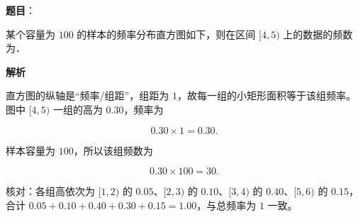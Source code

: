 \begin{answer}

\textbf{题目}：

某个容量为 $100$ 的样本的频率分布直方图如下，则在区间 $[4,5)$ 上的数据的频数为\gkblank{}．
\nopagebreak[4]
\begin{center}\end{center}
\nopagebreak[4]
\textbf{解析}

直方图的纵轴是“频率/组距”，组距为 $1$，故每一组的小矩形面积等于该组频率。图中 $[4,5)$ 一组的高为 $0.30$，频率为

\nopagebreak[4]
\[0.30\times1=0.30.\]

样本容量为 $100$，所以该组频数为

\nopagebreak[4]
\[0.30\times100=30.\]

核对：各组高依次为 $[1,2)$ 的 $0.05$、$[2,3)$ 的 $0.10$、$[3,4)$ 的 $0.40$、$[5,6)$ 的 $0.15$，合计 $0.05+0.10+0.40+0.30+0.15=1.00$，与总频率为 $1$ 一致。


\end{answer}
